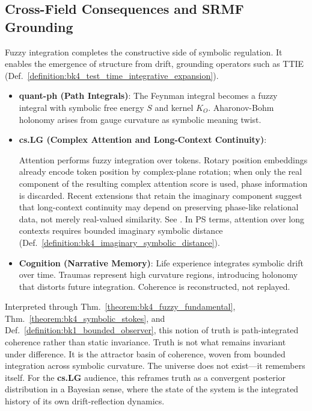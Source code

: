 \subsection{Cross-Field Consequences and SRMF Grounding}
\label{subsec:bk4_fuzzy_integration_applications}

Fuzzy integration completes the constructive side of symbolic regulation. It enables the emergence of structure from drift, grounding operators such as TTIE (Def.~\ref{definition:bk4_test_time_integrative_expansion}).

\begin{itemize}
    \item \textbf{quant-ph (Path Integrals)}: The Feynman integral becomes a fuzzy integral with symbolic free energy $S$ and kernel $K_O$. Aharonov-Bohm holonomy arises from gauge curvature as symbolic meaning twist.

    \item \textbf{cs.LG (Complex Attention and Long-Context Continuity)}:
    \begin{sloppypar}
    Attention performs fuzzy integration over tokens. Rotary position embeddings
    already encode token position by complex-plane rotation; when only the real
    component of the resulting complex attention score is used, phase information
    is discarded. Recent extensions that retain the imaginary component suggest
    that long-context continuity may depend on preserving phase-like relational
    data, not merely real-valued similarity. See \cite{liu2025ropeplusplus}.
    In PS terms, attention over long contexts requires bounded imaginary
    symbolic distance (Def.~\ref{definition:bk4_imaginary_symbolic_distance}).
    \end{sloppypar}

    \item \textbf{Cognition (Narrative Memory)}: Life experience integrates symbolic drift over time. Traumas represent high curvature regions, introducing holonomy that distorts future integration. Coherence is reconstructed, not replayed.
\end{itemize}

\begin{scholium}
\label{scholium:bk4_the_nature_of_truth}
Interpreted through Thm.~\ref{theorem:bk4_fuzzy_fundamental}, Thm.~\ref{theorem:bk4_symbolic_stokes}, and Def.~\ref{definition:bk1_bounded_observer}, this notion of truth is path-integrated coherence rather than static invariance.
Truth is not what remains invariant under difference. It is the attractor basin of coherence, woven from bounded integration across symbolic curvature. The universe does not exist---it remembers itself. For the \textbf{cs.LG} audience, this reframes truth as a convergent posterior distribution in a Bayesian sense, where the state of the system is the integrated history of its own drift-reflection dynamics.
\end{scholium}

